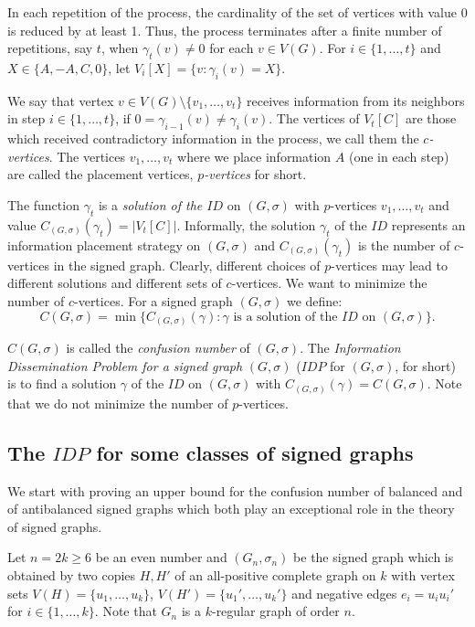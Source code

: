 \documentclass[a4paper,11pt]{article}
\theoremstyle{remark}
\begin{document}
In each repetition of the process, the cardinality of the set of vertices with value $0$ is reduced by at least 1. Thus, the process terminates after a finite number of repetitions, say $t$, when 
$\gamma_t(v) \not = 0$ for each $v \in V(G)$. 
For $i \in \{1, \dots, t\}$ and $X \in \{A,-A,C,0\}$,
let $V_i[X] = \{v \colon \gamma_i(v) = X\}$.


We say that vertex $v \in V(G) \setminus \{v_1, \dots,v_t\}$ receives 
information from its neighbors in step $i \in \{1, \dots,t\}$, 
if $0 = \gamma_{i-1}(v) \not = \gamma_i(v)$. 
The vertices of $V_t[C]$ 
are those which received contradictory information in the process,
we call them the $c${\em -vertices}. The vertices $v_1, \dots, v_t$ where we place information $A$ (one in each step) are called the placement vertices, $p${\em -vertices} for short. 

The function $\gamma_t$ is a {\em solution of the $ID$} on $(G,\sigma)$ 
with $p$-vertices $v_1, \dots, v_t$ and value $C_{(G,\sigma)}(\gamma_t) = \vert V_t[C]\vert$. Informally, 
the solution $\gamma_t$ of the $ID$ represents an information placement strategy on $(G,\sigma)$ and 
$C_{(G,\sigma)}(\gamma_t)$ is the number of $c$-vertices in the signed graph. 
Clearly, different choices of $p$-vertices may lead to different solutions and different sets of $c$-vertices. 
We want to minimize the number of $c$-vertices. For a signed graph $(G,\sigma)$ we define: 
$$C(G,\sigma) = \min \{C_{(G,\sigma)}(\gamma) \colon \gamma 
\text{ is a solution of the } ID \text{ on } (G,\sigma)\}.$$

$C(G,\sigma)$ is called the {\em confusion number} of $(G,\sigma)$.  
The {\em Information Dissemination Problem for a signed graph} $(G,\sigma)$ ($IDP$ for $(G,\sigma)$, for short) is to find a solution $\gamma$ of the $ID$ on $(G,\sigma)$ with $C_{(G,\sigma)}(\gamma) = C(G,\sigma)$. 
Note that we do not minimize the number of $p$-vertices. 


\subsection*{The $IDP$ for some classes of signed graphs}

We start with proving an upper bound for the confusion number of balanced and of antibalanced signed graphs which both play an exceptional role in the theory of signed graphs. 

Let $n = 2k \geq 6$ be an even number and $(G_n,\sigma_n)$ be the signed graph which is
obtained by two copies $H, H'$ of an all-positive 
complete graph on $k$ with vertex sets $V(H) = \{u_1, \dots , u_k\}$, $V(H') = \{u_1', \dots , u_k'\}$
and negative edges $e_i = u_iu_i'$ for $i \in \{1, \dots, k\}$. 
Note that $G_n$ is a $k$-regular graph of order $n$.
\end{document}
